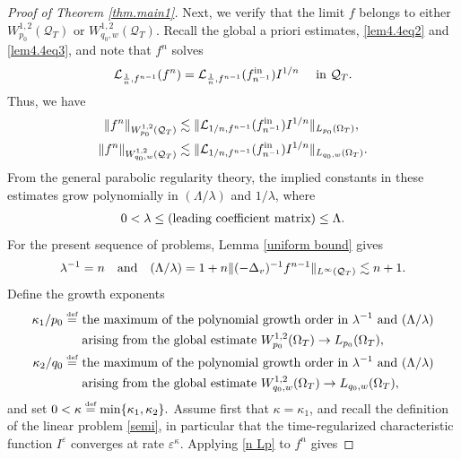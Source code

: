 \documentclass[reqno,11pt,final]{amsart}
\theoremstyle{plain}
\numberwithin{equation}{section}
\numberwithin{theorem}{section}
\newcommand{\eqdef }{\overset{\mbox{\tiny{def}}}{=}}
\begin{document}
\begin{proof}[Proof of Theorem \ref{thm.main1}]
Next, we verify that the limit $f$ belongs to either $W_{p_0}^{1,2}(\mathcal{Q}_T)$ or $W_{q_0,w}^{1,2}(\mathcal{Q}_T)$. Recall the global a priori estimates, \eqref{lem4.4eq2} and \eqref{lem4.4eq3}, and note that $f^n$ solves
\begin{align*}
    \mathcal{L}_{\frac{1}{n}, f^{n-1}}(f^n) = \mathcal{L}_{\frac{1}{n}, f^{n-1}}(f^\textup{in}_{n^{-1}})I^{1/n} \quad \textup{ in }\mathcal{Q}_T.
\end{align*}Thus, we have
\begin{align}\label{n Lp}
    \| f^n\|_{W_{p_0}^{1,2}(\mathcal{Q}_T)} &\lesssim \|\mathcal{L}_{1/n, f^{n-1}}(f^\textup{in}_{n^{-1}})I^{1/n}\|_{L_{p_0}(\Omega_T)},\\
    \| f^n\|_{W_{q_0,w}^{1,2}(\mathcal{Q}_T)} &\lesssim \|\mathcal{L}_{1/n, f^{n-1}}(f^\textup{in}_{n^{-1}})I^{1/n}\|_{L_{q_0,w}(\Omega_T)}.\label{n Lqw}
\end{align}From the general parabolic regularity theory, the implied constants in these estimates grow polynomially in $(\Lambda/\lambda)$ and $1/\lambda$, where
\begin{align*}
    0<\lambda \le (\textup{leading coefficient matrix}) \le \Lambda.
\end{align*}For the present sequence of problems, Lemma \ref{uniform bound} gives
\begin{align*}
    \lambda^{-1} = n \quad\textup{and}\quad (\Lambda/\lambda) = 1+n\|(-\Delta_v)^{-1}f^{n-1}\|_{L^\infty(\mathcal{Q}_T)}\lesssim n+1.
\end{align*}Define the growth exponents
\begin{align*}
    \kappa_1/p_0 \eqdef &\textup{ the maximum of the polynomial growth order in }\lambda^{-1} \textup{ and } (\Lambda/\lambda) \\
    &\textup{ arising from the global estimate } W_{p_0}^{1,2}(\Omega_T)\to L_{p_0}(\Omega_T),\\
    \kappa_2/q_0 \eqdef &\textup{ the maximum of the polynomial growth order in }\lambda^{-1} \textup{ and } (\Lambda/\lambda) \\
    &\textup{ arising from the global estimate } W_{q_0,w}^{1,2}(\Omega_T)\to L_{q_0,w}(\Omega_T),
\end{align*}and set $0<\kappa \eqdef \min\{\kappa_1, \kappa_2\}.$ Assume first that $\kappa = \kappa_1$, and recall the definition of the linear problem \eqref{semi}, in particular that the time-regularized characteristic function $I^\varepsilon$ converges at rate $\varepsilon^\kappa$.  Applying \eqref{n Lp} to  $f^n$ gives

\end{proof}
\end{document}

